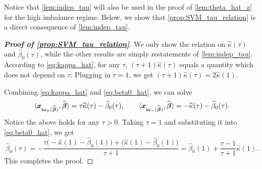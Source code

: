 Notice that \cref{lem:indep_tau} will also be used in the proof of \cref{lem:theta_hat_z} for the high imbalance regime. Below, we show that \cref{prop:SVM_tau_relation} is a direct consequence of \cref{lem:indep_tau}.

\begin{proof}[\textbf{Proof of \cref{prop:SVM_tau_relation}}]
We only show the relation on $\hat\kappa(\tau)$ and $\hat\beta_0(\tau)$, while the other results are simply restatements of \cref{lem:indep_tau}. According to \cref{eq:kappa_hat}, for any $\tau$, $(\tau + 1) \hat\kappa(\tau)$ equals a quantity which does not depend on $\tau$. Plugging in $\tau = 1$, we get $(\tau + 1) \hat\kappa(\tau) = 2 \hat\kappa(1)$.

Combining \cref{eq:kappa_hat} and \eqref{eq:beta0_hat}, we can solve
\begin{equation*}
    \langle \text{\boldmath $x$}_{\mathsf{sv}_+(\widehat{{\boldsymbol{\beta}}})}, \widehat{{\boldsymbol{\beta}}} \rangle = \tau \widehat\kappa(\tau) - \widehat\beta_0(\tau), 
    \qquad
    \langle \text{\boldmath $x$}_{\mathsf{sv}_-(\widehat{{\boldsymbol{\beta}}})}, \widehat{{\boldsymbol{\beta}}} \rangle = - \widehat\kappa(\tau) - \widehat\beta_0(\tau).
\end{equation*}
Notice the above holds for any $\tau > 0$. Taking $\tau = 1$ and substituting it into \cref{eq:beta0_hat}, we get
\begin{equation*}
\hat\beta_0(\tau) = -\frac{\tau \bigl(- \hat\kappa(1) - \hat\beta_0(1)\bigr) + \bigl(\hat\kappa(1) - \hat\beta_0(1) \bigr)}{\tau + 1} = \hat\beta_{0}(1) + \frac{\tau - 1}{\tau + 1} \hat\kappa(1).    
\end{equation*}
This completes the proof.
\end{proof}




